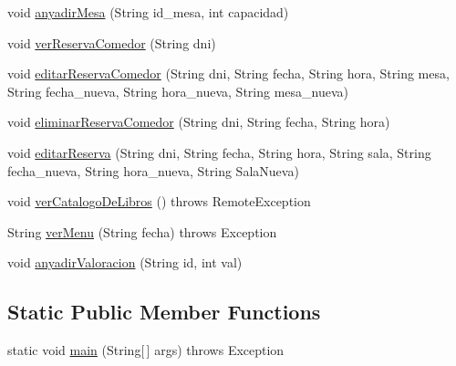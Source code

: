\begin{DoxyCompactItemize}
\item 
void \mbox{\hyperlink{classes_1_1deusto_1_1spq_1_1biblioteca_1_1controller_1_1_controller_a502ed4103be18f51da6bc2a87b03e77f}{anyadir\+Mesa}} (String id\+\_\+mesa, int capacidad)
\item 
void \mbox{\hyperlink{classes_1_1deusto_1_1spq_1_1biblioteca_1_1controller_1_1_controller_a75d13ac6d80a603e7d8c5482409580d7}{ver\+Reserva\+Comedor}} (String dni)
\item 
void \mbox{\hyperlink{classes_1_1deusto_1_1spq_1_1biblioteca_1_1controller_1_1_controller_a4788505e9337a94bc85512438e3f8997}{editar\+Reserva\+Comedor}} (String dni, String fecha, String hora, String mesa, String fecha\+\_\+nueva, String hora\+\_\+nueva, String mesa\+\_\+nueva)
\item 
void \mbox{\hyperlink{classes_1_1deusto_1_1spq_1_1biblioteca_1_1controller_1_1_controller_a709f6d0a11f0207932b47d670151c10e}{eliminar\+Reserva\+Comedor}} (String dni, String fecha, String hora)
\item 
void \mbox{\hyperlink{classes_1_1deusto_1_1spq_1_1biblioteca_1_1controller_1_1_controller_a484413ba14d131c9840c5cd7bd4d8494}{editar\+Reserva}} (String dni, String fecha, String hora, String sala, String fecha\+\_\+nueva, String hora\+\_\+nueva, String Sala\+Nueva)
\item 
void \mbox{\hyperlink{classes_1_1deusto_1_1spq_1_1biblioteca_1_1controller_1_1_controller_a68f64f2332ad51a02f0d24f322e2fe13}{ver\+Catalogo\+De\+Libros}} ()  throws Remote\+Exception 
\item 
String \mbox{\hyperlink{classes_1_1deusto_1_1spq_1_1biblioteca_1_1controller_1_1_controller_a33b36798ff65a516ecf45f872cb09235}{ver\+Menu}} (String fecha)  throws Exception 
\item 
void \mbox{\hyperlink{classes_1_1deusto_1_1spq_1_1biblioteca_1_1controller_1_1_controller_acec274a871e11de7635bbfbe6fea2817}{anyadir\+Valoracion}} (String id, int val)
\end{DoxyCompactItemize}
\subsection*{Static Public Member Functions}
\begin{DoxyCompactItemize}
\item 
static void \mbox{\hyperlink{classes_1_1deusto_1_1spq_1_1biblioteca_1_1controller_1_1_controller_aebc01845557525b0f7326b2ad5c612b2}{main}} (String\mbox{[}$\,$\mbox{]} args)  throws Exception 
\end{DoxyCompactItemize}


